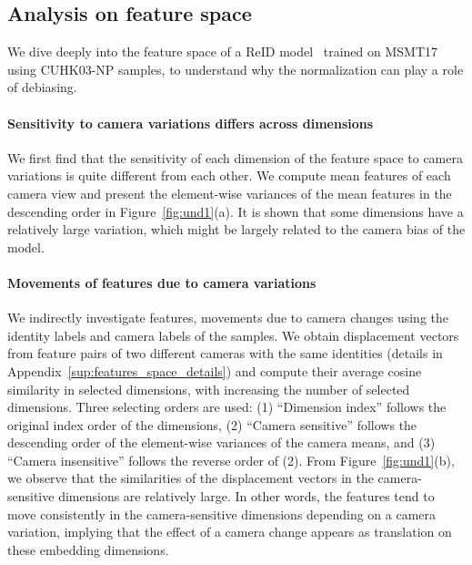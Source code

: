 \subsection{Analysis on feature space}
\label{subsec:features_space}
We dive deeply into the feature space of a ReID model~\citep{luo2021self} trained on MSMT17 using CUHK03-NP samples, to understand why the normalization can play a role of debiasing.

\paragraph{Sensitivity to camera variations differs across dimensions}
We first find that the sensitivity of each dimension of the feature space to camera variations is quite different from each other.
We compute mean features of each camera view and present the element-wise variances of the mean features in the descending order in Figure~\ref{fig:und1}(a).
It is shown that some dimensions have a relatively large variation, which might be largely related to the camera bias of the model.

\paragraph{Movements of features due to camera variations}
We indirectly investigate features, movements due to camera changes using the identity labels and camera labels of the samples.
We obtain displacement vectors from feature pairs of two different cameras with the same identities (details in Appendix~\ref{sup:features_space_details}) and compute their average cosine similarity in selected dimensions, with increasing the number of selected dimensions.
Three selecting orders are used: 
(1) ``Dimension index'' follows the original index order of the dimensions, 
(2) ``Camera sensitive'' follows the descending order of 
the element-wise variances of the camera means,
and (3) ``Camera insensitive'' follows the reverse order of (2).
From Figure~\ref{fig:und1}(b), we observe that the similarities of the displacement vectors in the camera-sensitive dimensions are relatively large.
In other words, the features tend to move consistently in the camera-sensitive dimensions depending on a camera variation, implying that the effect of a camera change appears as translation on these embedding dimensions.



